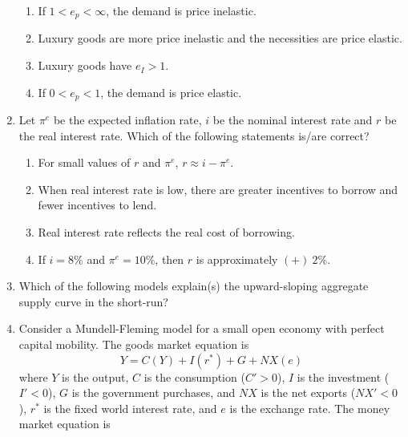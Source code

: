 \documentclass[12pt]{article}
\theoremstyle{remark}
\begin{document}
\begin{enumerate}
\begin{enumerate}
\item   If $1 < e_p < \infty$, the demand is price inelastic. 
\item   Luxury goods are more price inelastic and the necessities are price elastic. 
\item   Luxury goods have $e_I > 1$. 
\item   If $0 < e_p < 1$, the demand is price elastic. 
\end{enumerate}
\hfill{}
\item Let $\pi^e$ be the expected inflation rate, $i$ be the nominal interest rate and $r$ be the real interest rate. Which of the following statements is/are correct? 
\begin{enumerate} 
\item   For small values of $r$ and $\pi^e$, $r \approx i - \pi^e$. 
\item   When real interest rate is low, there are greater incentives to borrow and fewer incentives to lend. 
\item   Real interest rate reflects the real cost of borrowing. 
\item   If $i = 8\%$ and $\pi^e = 10\%$, then $r$ is approximately $(+)\ 2\%$. 
\end{enumerate}
\hfill{}
\item  Which of the following models explain(s) the upward-sloping aggregate supply curve in the short-run? 
\begin{enumerate}  \end{enumerate}
\hfill{}
\item   Consider a Mundell-Fleming model for a small open economy with perfect capital mobility. The goods market equation is $$Y = C(Y) + I(r^*) + G + NX(e)$$ where $Y$ is the output, $C$ is the consumption ($C' > 0$), $I$ is the investment ($I' < 0$), $G$ is the government purchases, and $NX$ is the net exports ($NX' < 0$), 
$r^*$ is the fixed world interest rate, and $e$ is the exchange rate. \newline
The money market equation is \newline

\end{enumerate}
\end{document}
